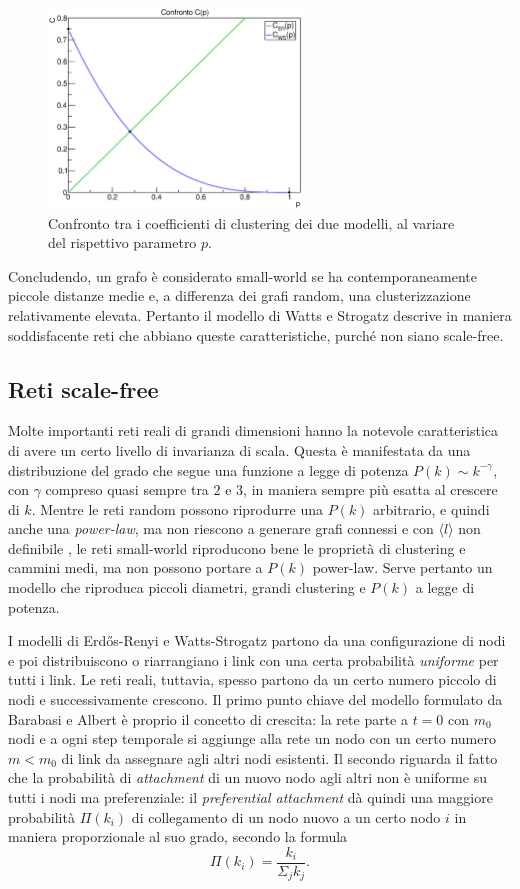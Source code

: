 \begin{figure}[t!]
	\centering
	\includegraphics[width=0.6\textwidth]{./Immagini/Par1/confrontoC}
	\caption{Confronto tra i coefficienti di clustering dei due modelli, al variare del rispettivo parametro $p$.}
	\label{fig:ring}
\end{figure}

Concludendo, un grafo è considerato small-world se ha contemporaneamente piccole distanze medie e, a differenza dei grafi random,  una clusterizzazione relativamente elevata. Pertanto il modello di Watts e Strogatz descrive in maniera soddisfacente reti che abbiano queste caratteristiche, purché non siano scale-free.

\subsection{Reti scale-free} 
Molte importanti reti reali di grandi dimensioni hanno la notevole caratteristica di avere un certo livello di invarianza di scala. Questa è manifestata da una distribuzione del grado che segue una funzione a legge di potenza $P(k)\sim k^{-\gamma}$, con $\gamma$ compreso quasi sempre tra $2$ e $3$, in maniera sempre più esatta al crescere di $k$. Mentre le reti random possono riprodurre una $P(k)$ arbitrario, e quindi anche una \emph{power-law}, ma non riescono a generare grafi connessi e con $\langle l \rangle$ non definibile \parencite{Barbalbert2002}, le reti small-world riproducono bene le proprietà di clustering e cammini medi, ma non possono portare a $P(k)$ power-law. Serve pertanto un modello che riproduca piccoli diametri, grandi clustering e $P(k)$ a legge di potenza.

I modelli di Erdős-Renyi e Watts-Strogatz partono da una configurazione di nodi e poi distribuiscono o riarrangiano i link con una certa probabilità \emph{uniforme} per tutti i link. Le reti reali, tuttavia, spesso partono da un certo numero piccolo di nodi e successivamente crescono. Il primo punto chiave del modello formulato da Barabasi e Albert è proprio il concetto di crescita: la rete parte a $t=0$ con $m_0$ nodi e a ogni step temporale si aggiunge alla rete un nodo con un certo numero $m < m_0$ di link da assegnare agli altri nodi esistenti. Il secondo riguarda il fatto che la probabilità di \emph{attachment} di un nuovo nodo agli altri non è uniforme su tutti i nodi ma preferenziale: il \emph{preferential attachment} dà quindi una maggiore probabilità $\Pi (k_i)$ di collegamento di un nodo nuovo a un certo nodo $i$ in maniera proporzionale al suo grado, secondo la formula
\[\Pi (k_i) = \frac{k_i}{\Sigma_j k_j}.\]

